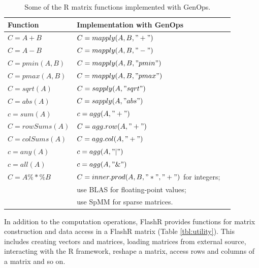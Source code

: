 \begin{table}
\begin{center}
\footnotesize
\begin{tabular}{|l|l|l|}
\hline
Function & Implementation with GenOps \\
\hline
$C=A+B$ & $C=mapply(A, B, "+")$ \\
$C=A-B$ & $C=mapply(A, B, "-")$ \\
$C=pmin(A,B)$ & $C=mapply(A, B, "pmin")$ \\
$C=pmax(A,B)$ & $C=mapply(A, B, "pmax")$ \\
$C=sqrt(A)$ & $C=sapply(A, "sqrt")$ \\
$C=abs(A)$ & $C=sapply(A, "abs")$ \\
\hline
$c=sum(A)$ & $c=agg(A, "+")$ \\
$C=rowSums(A)$ & $C=agg.row(A, "+")$ \\
$C=colSums(A)$ & $C=agg.col(A, "+")$ \\
$c=any(A)$ & $c=agg(A, "|")$ \\
$c=all(A)$ & $c=agg(A, "\&")$ \\
\hline
$C=A \%*\% B$ & $C=inner.prod(A, B, "*", "+")$ for integers; \\
 & use BLAS for floating-point values; \\
 & use SpMM \cite{SEM_SpMM} for sparse matrices. \\
\hline
\end{tabular}
\normalsize
\end{center}
\caption{Some of the R matrix functions implemented with GenOps.}
\label{tbl:Rfuns}
\end{table}

In addition to the computation operations, FlashR provides functions for matrix
construction and data access in a FlashR matrix (Table \ref{tbl:utility}). This
includes creating vectors and matrices, loading matrices from external source,
interacting with the R framework, reshape a matrix, access rows and columns of
a matrix and so on.

